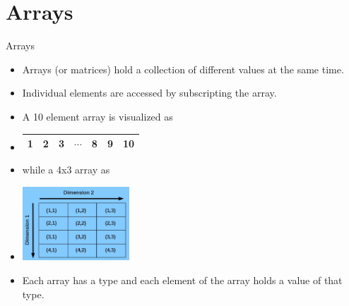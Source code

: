 \documentclass[10pt,t]{beamer}
\begin{document}
\section{Arrays}
\begin{frame}{Arrays}
  \begin{itemize}
    \item Arrays (or matrices) hold a collection of different values at the same time.
    \item Individual elements are accessed by subscripting the array.
    \item A 10 element array is visualized as
    \item[]
      \begin{center}
        \begin{tabular}{|c|c|c|c|c|c|c|}
          \hline
          1 & 2 & 3 & $\cdots$ & 8 & 9 & 10 \\
          \hline
        \end{tabular}
      \end{center}
    \item[] while a 4x3 array as
    \item[]
      \begin{center}
        \includegraphics[width=4cm,clip=true]{./graphics/array1}
      \end{center}
    \item Each array has a type and each element of the array holds a value of that type.
  \end{itemize}
\end{frame} 
\end{document}
